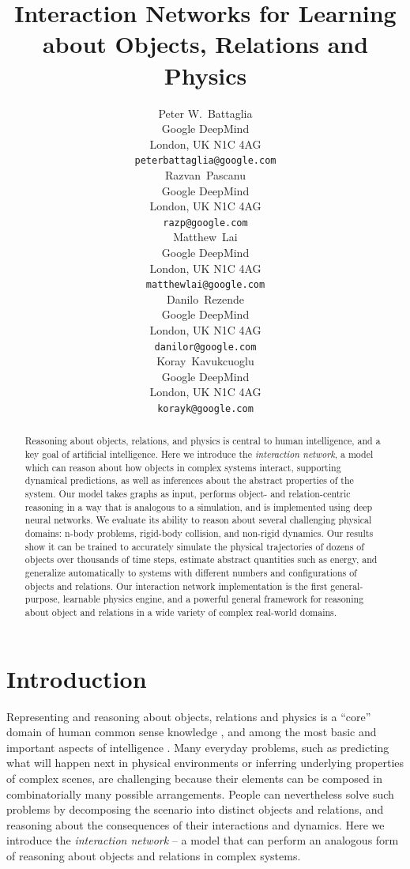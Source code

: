 \documentclass{article}
\title{Interaction Networks for Learning about Objects, Relations and
  Physics}
\author{
  Peter W.~Battaglia \\
  Google DeepMind\\
  London, UK N1C 4AG \\
  \texttt{peterbattaglia@google.com} \\
  \And
  Razvan~Pascanu \\
  Google DeepMind\\
  London, UK N1C 4AG \\
  \texttt{razp@google.com} \\
  \And
  Matthew~Lai \\
  Google DeepMind\\
  London, UK N1C 4AG \\
  \texttt{matthewlai@google.com} \\
  \And
  Danilo~Rezende \\
  Google DeepMind\\
  London, UK N1C 4AG \\
  \texttt{danilor@google.com} \\
  \And
  Koray~Kavukcuoglu \\
  Google DeepMind\\
  London, UK N1C 4AG \\
  \texttt{korayk@google.com} \\
}
\begin{document}
\maketitle


\begin{abstract}
  Reasoning about objects, relations, and physics is central to human
  intelligence, and a key goal of artificial intelligence. Here we
  introduce the \textit{interaction network}, a model which can reason
  about how objects in complex systems interact, supporting dynamical
  predictions, as well as inferences about the abstract properties of
  the system.  Our model takes graphs as input, performs object- and
  relation-centric reasoning in a way that is analogous to a
  simulation, and is implemented using deep neural networks. We
  evaluate its ability to reason about several challenging physical
  domains: n-body problems, rigid-body collision, and non-rigid
  dynamics. Our results show it can be trained to accurately simulate
  the physical trajectories of dozens of objects over thousands of
  time steps, estimate abstract quantities such as energy, and
  generalize automatically to systems with different numbers and
  configurations of objects and relations. Our interaction network
  implementation is the first general-purpose, learnable physics
  engine, and a powerful general framework for reasoning about object
  and relations in a wide variety of complex real-world domains.
\end{abstract}

\section{Introduction}
Representing and reasoning about objects, relations and physics is a
``core'' domain of human common sense knowledge \cite{Spelke1992}, and
among the most basic and important aspects of intelligence
\cite{tenenbaum2011grow,lake2016building}. Many everyday problems,
such as predicting what will happen next in physical environments or
inferring underlying properties of complex scenes, are challenging
because their elements can be composed in combinatorially many
possible arrangements. People can nevertheless solve such problems by
decomposing the scenario into distinct objects and relations, and
reasoning about the consequences of their interactions and
dynamics. Here we introduce the \textit{interaction network} -- a
model that can perform an analogous form of reasoning about objects
and relations in complex systems.
\end{document}
